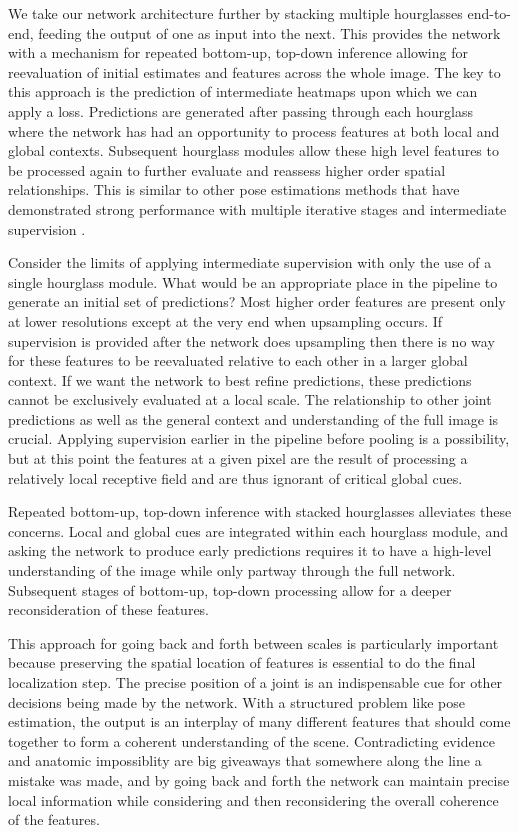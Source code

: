 \documentclass[runningheads]{llncs}
\begin{document}
We take our network architecture further by stacking multiple
hourglasses end-to-end, feeding the output of one as input into the
next. This provides the network with a mechanism for repeated
bottom-up, top-down inference allowing for reevaluation of initial
estimates and features across the whole image. The key to this
approach is the prediction of intermediate heatmaps upon which we can
apply a loss. Predictions are generated after passing through each
hourglass where the network has had an opportunity to process features
at both local and global contexts. Subsequent hourglass modules allow
these high level features to be processed again to further evaluate
and reassess higher order spatial relationships. This is similar to
other pose estimations methods that have demonstrated strong
performance with multiple iterative stages and intermediate
supervision \cite{carreira2015human,wei2016machines,pfister2015flowing}.

Consider the limits of applying intermediate supervision with only the
use of a single hourglass module. What would be an appropriate place
in the pipeline to generate an initial set of predictions? Most higher
order features are present only at lower resolutions except at the
very end when upsampling occurs. If supervision is provided after the
network does upsampling then there is no way for these features to be
reevaluated relative to each other in a larger global context. If we
want the network to best refine predictions, these predictions cannot
be exclusively evaluated at a local scale. The relationship to other
joint predictions as well as the general context and understanding of
the full image is crucial. Applying supervision earlier in
the pipeline before pooling is a possibility, but at this point the
features at a given pixel are the result of processing a relatively
local receptive field and are thus ignorant of critical global cues.

Repeated bottom-up, top-down inference with stacked hourglasses
alleviates these concerns. Local and global cues are integrated within
each hourglass module, and asking the network to produce early
predictions requires it to have a high-level understanding of the
image while only partway through the full network. Subsequent stages
of bottom-up, top-down processing allow for a deeper reconsideration
of these features.

This approach for going back and forth between scales is particularly
important because preserving the spatial location of features is
essential to do the final localization step. The precise position of a
joint is an indispensable cue for other decisions being made by the
network. With a structured problem like pose estimation, the output is
an interplay of many different features that should come together to
form a coherent understanding of the scene. Contradicting evidence and
anatomic impossiblity are big giveaways that somewhere along the line
a mistake was made, and by going back and forth the network can
maintain precise local information while considering and then
reconsidering the overall coherence of the features.
\end{document}
